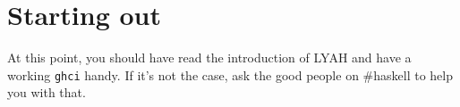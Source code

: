 \section{Starting out}

At this point, you should have read the introduction of LYAH and have a working
\texttt{ghci} handy. If it's not the case, ask the good people on \#haskell to
help you with that.

